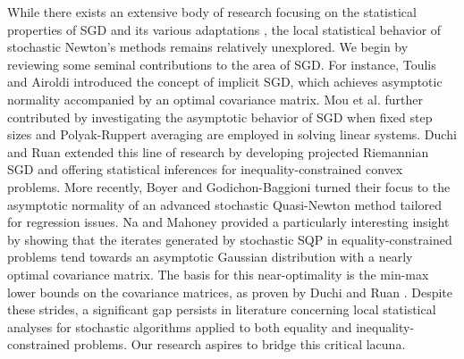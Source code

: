 \documentclass[aos]{imsart}
\numberwithin{equation}{section}
\theoremstyle{plain}
\begin{document}
While there exists an extensive body of research focusing on the statistical properties of SGD and its various adaptations \cite{polyak1992acceleration, chen2020statistical}, the local statistical behavior of stochastic Newton's methods remains relatively unexplored. 
We begin by reviewing some seminal contributions to the area of SGD. For instance, Toulis and Airoldi \cite{toulis2017asymptotic} introduced the concept of implicit SGD, which achieves asymptotic normality accompanied by an optimal covariance matrix. Mou et al. \cite{mou2020linear} further contributed by investigating the asymptotic behavior of SGD when fixed step sizes and Polyak-Ruppert averaging are employed in solving linear systems.
Duchi and Ruan \cite{duchi2021asymptotic} extended this line of research by developing projected Riemannian SGD and offering statistical inferences for inequality-constrained convex problems.
More recently, Boyer and Godichon-Baggioni \cite{boyer2023asymptotic} turned their focus to the asymptotic normality of an advanced stochastic Quasi-Newton method tailored for regression issues.
Na and Mahoney \cite{na2022asymptotic} provided a particularly interesting insight by showing that the iterates generated by stochastic SQP in equality-constrained problems tend towards an asymptotic Gaussian distribution with a nearly optimal covariance matrix.
The basis for this near-optimality is the min-max lower bounds on the covariance matrices, as proven by Duchi and Ruan \cite{duchi2021asymptotic}. 
Despite these strides, a significant gap persists in literature concerning local statistical analyses for stochastic algorithms applied to both equality and inequality-constrained problems. Our research aspires to bridge this critical lacuna.
\end{document}
